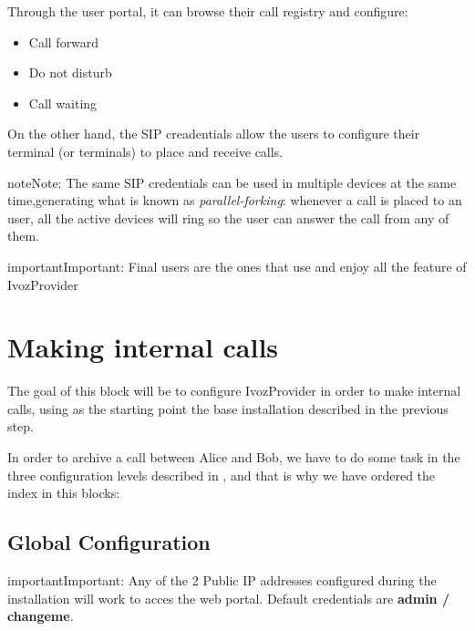 \documentclass[letterpaper,10pt,english]{sphinxmanual}
\begin{document}
Through the user portal, it can browse their call registry and configure:
\begin{itemize}
\item {} 
Call forward

\item {} 
Do not disturb

\item {} 
Call waiting

\end{itemize}

On the other hand, the SIP creadentials allow the users to configure
their terminal (or terminals) to place and receive calls.

\begin{notice}{note}{Note:}
The same SIP credentials can be used in multiple devices at the same
time,generating what is known as \emph{parallel-forking}: whenever a call is
placed to an user, all the active devices will ring so the user can
answer the call from any of them.
\end{notice}

\begin{notice}{important}{Important:}
Final users are the ones that use and enjoy all the feature of
IvozProvider
\end{notice}


\chapter{Making internal calls}
\label{getting_started/internal_calls/index:making-internal-calls}\label{getting_started/internal_calls/index::doc}
The goal of this block will be to configure IvozProvider in order to make
internal calls, using as the starting point the base installation described
in the previous step.

In order to archive a call between Alice and Bob, we have to do some task in
the three configuration levels described in {\hyperref[basics/operation_roles/index:operation\string-roles]{}}, and that
is why we have ordered the index in this blocks:


\section{Global Configuration}
\label{getting_started/internal_calls/god_portal:global-configuration}\label{getting_started/internal_calls/god_portal::doc}
\begin{notice}{important}{Important:}
Any of the 2 Public IP addresses configured during the
installation will work to acces the web portal. Default credentials are
\textbf{admin / changeme}.
\end{notice}
\end{document}
